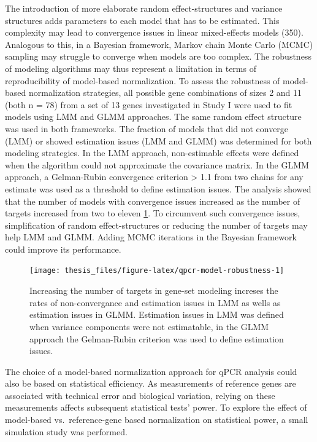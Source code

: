 \documentclass[twoside,10pt]{gihclass} %
\begin{document}
The introduction of more elaborate random effect-structures and variance structures adds parameters to each model that has to be estimated. This complexity may lead to convergence issues in linear mixed-effects models
(350).
Analogous to this, in a Bayesian framework, Markov chain Monte Carlo (MCMC) sampling may struggle to converge when models are too complex.
The robustness of modeling algorithms may thus represent a limitation in terms of reproducibility of model-based normalization.
To assess the robustness of model-based normalization strategies, all possible gene combinations of sizes 2 and 11 (both n = 78) from a set of 13 genes investigated in Study I were used to fit models using LMM and GLMM approaches.
The same random effect structure was used in both frameworks.
The fraction of models that did not converge (LMM) or showed estimation issues (LMM and GLMM) was determined for both modeling strategies. In the LMM approach, non-estimable effects were defined when the algorithm could not approximate the covariance matrix. In the GLMM approach, a Gelman-Rubin convergence criterion \textgreater{} 1.1 from two chains for any estimate was used as a threshold to define estimation issues.
The analysis showed that the number of models with convergence issues increased as the number of targets increased from two to eleven \ref{fig:qpcr-model-robustness}. To circumvent such convergence issues, simplification of random effect-structures or reducing the number of targets may help LMM and GLMM. Adding MCMC iterations in the Bayesian framework could improve its performance.
\begin{figure}

{\centering \texttt{[image: thesis\_files/figure-latex/qpcr-model-robustness-1]} 

}

\caption[Robustness of model-based qPCR normalization]{Increasing the number of targets in gene-set modeling increses the rates of non-convergance and estimation issues in LMM as wells as estimation issues in GLMM. Estimation issues in LMM was defined when variance components were not estimatable, in the GLMM approach the Gelman-Rubin criterion was used to define estimation issues.}\label{fig:qpcr-model-robustness}
\end{figure}
The choice of a model-based normalization approach for qPCR analysis could also be based on statistical efficiency. As measurements of reference genes are associated with technical error and biological variation, relying on these measurements affects subsequent statistical tests' power. To explore the effect of model-based vs.~reference-gene based normalization on statistical power, a small simulation study was performed.
\end{document}
